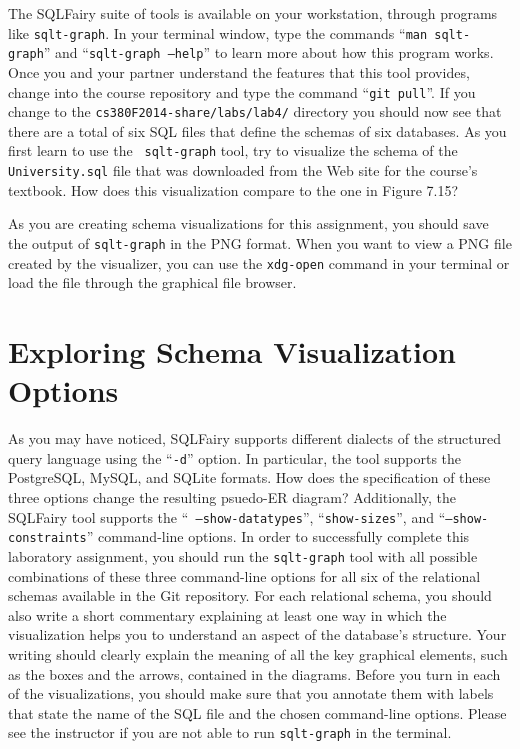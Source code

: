 The SQLFairy suite of tools is available on your workstation, through programs like {\tt sqlt-graph}.  In your terminal
window, type the commands ``{\tt man sqlt-graph}'' and ``{\tt sqlt-graph --help}'' to learn more about how this program
works. Once you and your partner understand the features that this tool provides, change into the course repository and
type the command ``{\tt git pull}''. If you change to the {\tt cs380F2014-share/labs/lab4/} directory you should now see
that there are a total of six SQL files that define the schemas of six databases. As you first learn to use the {\tt
  sqlt-graph} tool, try to visualize the schema of the {\tt University.sql} file that was downloaded from the Web site
for the course's textbook. How does this visualization compare to the one in Figure 7.15? 

As you are creating schema visualizations for this assignment, you should save the output of {\tt sqlt-graph} in the PNG
format.  When you want to view a PNG file created by the visualizer, you can use the {\tt xdg-open} command in your
terminal or load the file through the graphical file browser.

\vspace*{-.05in}
\section*{Exploring Schema Visualization Options}

As you may have noticed, SQLFairy supports different dialects of the structured query language using the ``{\tt -d}''
option.  In particular, the tool supports the PostgreSQL, MySQL, and SQLite formats.  How does the specification of
these three options change the resulting psuedo-ER diagram? Additionally, the SQLFairy tool supports the ``{\tt
  --show-datatypes}'', ``{\tt show-sizes}'', and ``{\tt --show-constraints}'' command-line options.  In order to
successfully complete this laboratory assignment, you should run the {\tt sqlt-graph} tool with all possible
combinations of these three command-line options for all six of the relational schemas available in the Git repository.
For each relational schema, you should also write a short commentary explaining at least one way in which the
visualization helps you to understand an aspect of the database's structure. Your writing should clearly explain the
meaning of all the key graphical elements, such as the boxes and the arrows, contained in the diagrams. Before you turn
in each of the visualizations, you should make sure that you annotate them with labels that state the name of the SQL
file and the chosen command-line options. Please see the instructor if you are not able to run {\tt sqlt-graph} in the
terminal.

